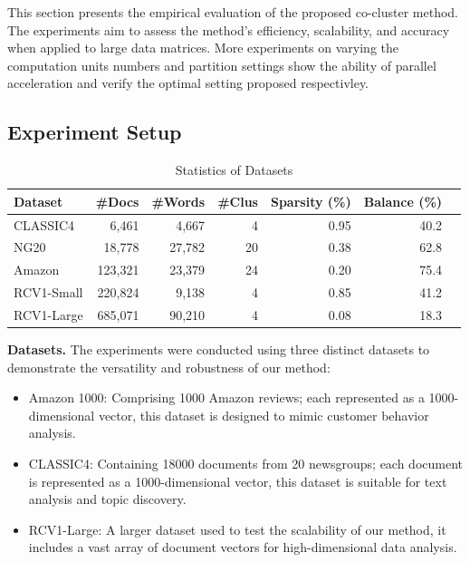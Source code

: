 \documentclass[journal]{IEEEtran}
\begin{document}
This section presents the empirical evaluation of the proposed co-cluster method. The experiments aim to assess the method's efficiency, scalability, and accuracy when applied to large data matrices. More experiments on varying the computation units numbers and partition settings show the ability of parallel acceleration and verify the optimal setting proposed respectivley.

\subsection{Experiment Setup}

\begin{table}[h]
  \centering
  \caption{Statistics of Datasets}
  \begin{tabular}{lrrrrrr}
    \hline
    \textbf{Dataset} & \textbf{\#Docs} & \textbf{\#Words} & \textbf{\#Clus} & \textbf{Sparsity (\%)} & \textbf{Balance (\%)} \\
    \hline
    CLASSIC4         & 6,461           & 4,667            & 4               & 0.95                   & 40.2                  \\
    NG20             & 18,778          & 27,782           & 20              & 0.38                   & 62.8                  \\
    Amazon           & 123,321         & 23,379           & 24              & 0.20                   & 75.4                  \\
    RCV1-Small       & 220,824         & 9,138            & 4               & 0.85                   & 41.2                  \\
    RCV1-Large       & 685,071         & 90,210           & 4               & 0.08                   & 18.3                  \\
    \hline
  \end{tabular}
\end{table}

\textbf{Datasets.}
The experiments were conducted using three distinct datasets to demonstrate the versatility and robustness of our method:

\begin{itemize}
  \item Amazon 1000: Comprising 1000 Amazon reviews; each represented as a 1000-dimensional vector, this dataset is designed to mimic customer behavior analysis.
  \item CLASSIC4: Containing 18000 documents from 20 newsgroups; each document is represented as a 1000-dimensional vector, this dataset is suitable for text analysis and topic discovery.
  \item RCV1-Large: A larger dataset used to test the scalability of our method, it includes a vast array of document vectors for high-dimensional data analysis.
\end{itemize}
\end{document}
